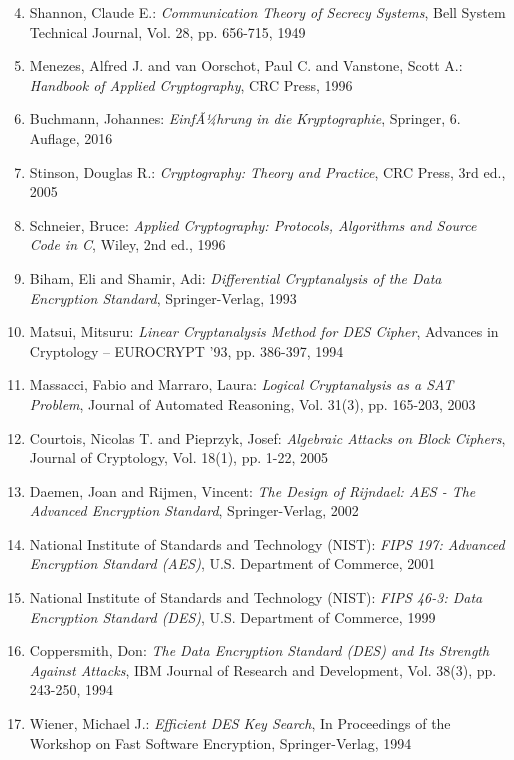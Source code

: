 ﻿\documentclass[12pt,a4paper]{article}
\begin{document}
	\begin{enumerate}
		\setcounter{enumi}{3}
		\item Shannon, Claude E.: \textit{Communication Theory of Secrecy Systems}, Bell System Technical Journal, Vol. 28, pp. 656-715, 1949
		\item Menezes, Alfred J. and van Oorschot, Paul C. and Vanstone, Scott A.: \textit{Handbook of Applied Cryptography}, CRC Press, 1996
		\item Buchmann, Johannes: \textit{EinfÃ¼hrung in die Kryptographie}, Springer, 6. Auflage, 2016
		\item Stinson, Douglas R.: \textit{Cryptography: Theory and Practice}, CRC Press, 3rd ed., 2005
		\item Schneier, Bruce: \textit{Applied Cryptography: Protocols, Algorithms and Source Code in C}, Wiley, 2nd ed., 1996
	\end{enumerate}
	
	\begin{enumerate}
		\setcounter{enumi}{8}
		\item Biham, Eli and Shamir, Adi: \textit{Differential Cryptanalysis of the Data Encryption Standard}, Springer-Verlag, 1993
		\item Matsui, Mitsuru: \textit{Linear Cryptanalysis Method for DES Cipher}, Advances in Cryptology -- EUROCRYPT '93, pp. 386-397, 1994
		\item Massacci, Fabio and Marraro, Laura: \textit{Logical Cryptanalysis as a SAT Problem}, Journal of Automated Reasoning, Vol. 31(3), pp. 165-203, 2003
		\item Courtois, Nicolas T. and Pieprzyk, Josef: \textit{Algebraic Attacks on Block Ciphers}, Journal of Cryptology, Vol. 18(1), pp. 1-22, 2005
	\end{enumerate}
	
	\begin{enumerate}
		\setcounter{enumi}{12}
		\item Daemen, Joan and Rijmen, Vincent: \textit{The Design of Rijndael: AES - The Advanced Encryption Standard}, Springer-Verlag, 2002
		\item National Institute of Standards and Technology (NIST): \textit{FIPS 197: Advanced Encryption Standard (AES)}, U.S. Department of Commerce, 2001
		\item National Institute of Standards and Technology (NIST): \textit{FIPS 46-3: Data Encryption Standard (DES)}, U.S. Department of Commerce, 1999
		\item Coppersmith, Don: \textit{The Data Encryption Standard (DES) and Its Strength Against Attacks}, IBM Journal of Research and Development, Vol. 38(3), pp. 243-250, 1994
		\item Wiener, Michael J.: \textit{Efficient DES Key Search}, In Proceedings of the Workshop on Fast Software Encryption, Springer-Verlag, 1994
	\end{enumerate}
	
\end{document}
